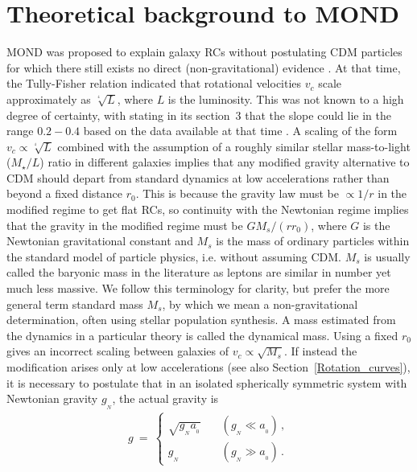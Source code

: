 \documentclass[fleqn,usenatbib,useAMS]{mnras} %
\begin{document}
\section{Theoretical background to MOND}
\label{MOND_theory}

MOND was proposed to explain galaxy RCs without postulating CDM particles for which there still exists no direct (non-gravitational) evidence \citep{Milgrom_1983}. At that time, the Tully-Fisher relation \citep[TFR;][]{Tully_Fisher_1977} indicated that rotational velocities $v_c$ scale approximately as $\sqrt[^4]{L}$, where $L$ is the luminosity. This was not known to a high degree of certainty, with \citet{Milgrom_1983_galaxies} stating in its section~3 that the slope could lie in the range $0.2-0.4$ based on the data available at that time \citep[for a historical review, see e.g.][]{Sanders_2010, Sanders_2015}. A scaling of the form $v_c \propto \sqrt[^4]{L}$ combined with the assumption of a roughly similar stellar mass-to-light ($M_{\star}/L$) ratio in different galaxies implies that any modified gravity alternative to CDM should depart from standard dynamics at low accelerations rather than beyond a fixed distance $r_0$. This is because the gravity law must be $\propto 1/r$ in the modified regime to get flat RCs, so continuity with the Newtonian regime implies that the gravity in the modified regime must be $GM_s/\left(rr_0\right)$, where $G$ is the Newtonian gravitational constant and $M_s$ is the mass of ordinary particles within the standard model of particle physics, i.e. without assuming CDM. $M_s$ is usually called the baryonic mass in the literature as leptons are similar in number yet much less massive. We follow this terminology for clarity, but prefer the more general term standard mass $M_s$, by which we mean a non-gravitational determination, often using stellar population synthesis. A mass estimated from the dynamics in a particular theory is called the dynamical mass. Using a fixed $r_0$ gives an incorrect scaling between galaxies of $v_c \propto \sqrt{M_s}$. If instead the modification arises only at low accelerations (see also Section~\ref{Rotation_curves}), it is necessary to postulate that in an isolated spherically symmetric system with Newtonian gravity $g_{_N}$, the actual gravity is
\begin{eqnarray}
	g ~=~ \left\{
	\begin{array}{ll}
		\sqrt{g_{_N} a_{_0}} &\quad \left( g_{_N} \ll a_{_0} \right) \, , \\ 
		g_{_N} &\quad \left( g_{_N} \gg a_{_0} \right) \, .
	\end{array}
	\right.
	\label{MOND_basic}
\end{eqnarray}
\end{document}
